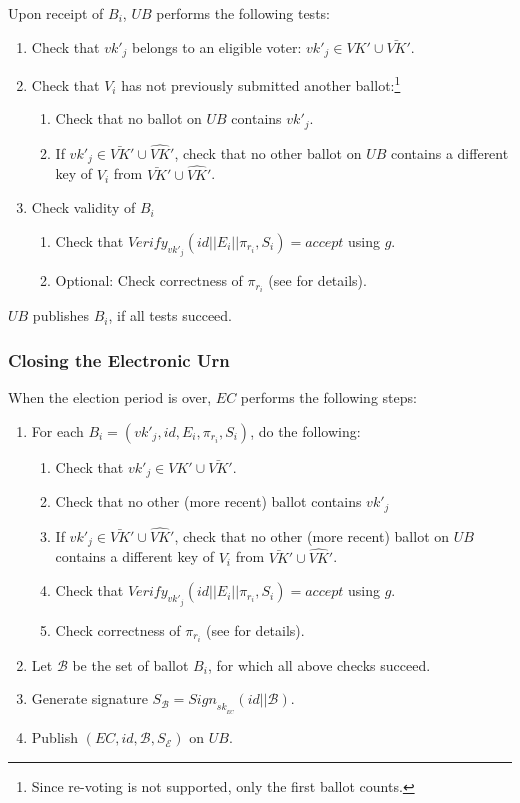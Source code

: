 \documentclass[bibtotoc,halfparskip,oneside]{scrreprt}
\newcommand{\eid}{\mathit{id}\xspace}
\newcommand{\sk}[1]{\mathit{sk}_{#1}\xspace}
\newcommand{\vkprime}[1]{\mathit{vk}'_{#1}\xspace}
\newcommand{\SK}[1]{\sk{_#1}\xspace}
\newcommand{\EC}{\ensuremath{\mathit{EC}}\xspace}
\newcommand{\UB}{\ensuremath{\mathit{UB}}\xspace}
\newcommand{\Voter}[1]{\ensuremath{\mathit{V}_{#1}}\xspace}
\begin{document}
Upon receipt of $B_i$, \UB performs the following tests:
\begin{enumerate}[resume]
	\item Check that $\vkprime{j}$ belongs to an eligible voter: $\vkprime{j}\in \mathit{VK}'\cup \bar{\mathit{VK}}'$.
	\item Check that $\Voter{i}$ has not previously submitted another ballot:\footnote{Since re-voting is not supported, only the first ballot counts.}
	\begin{enumerate}
		\item Check that no ballot on \UB contains $\vkprime{j}$.
		\item If $\vkprime{j}\in \bar{VK}'\cup\hat{VK}'$, check that no other ballot on \UB contains a different key of $\Voter{i}$ from $\bar{VK}'\cup\hat{VK}'$.
	\end{enumerate}
	\item Check validity of $B_i$
	\begin{enumerate}
		\item Check that $\mathit{Verify}_{\vkprime{j}}(\eid||E_i||\pi_{r_i},S_i)=\mathit{accept}$ using $\hat{g}$.
		\item Optional: Check correctness of $\pi_{r_i}$ (see  for details).
	\end{enumerate}
\end{enumerate}
\UB publishes $B_i$, if all tests succeed.

\subsubsection{Closing the Electronic Urn}

When the election period is over, \EC performs the following steps:
\begin{enumerate}
	\item For each $B_i=(\vkprime{j},\eid,E_i,\pi_{r_i},S_i)$, do the following:
	\begin{enumerate}
		\item Check that $\vkprime{j}\in \mathit{VK}'\cup \bar{\mathit{VK}}'$.
		\item Check that no other (more recent) ballot contains $\vkprime{j}$
		\item If $\vkprime{j}\in \bar{VK}'\cup\hat{VK}'$, check that no other (more recent) ballot on \UB contains a different key of $\Voter{i}$ from $\bar{VK}'\cup\hat{VK}'$.
		\item Check that $\mathit{Verify}_{\vkprime{j}}(\eid||E_i||\pi_{r_i},S_i)=\mathit{accept}$ using $\hat{g}$.
		\item Check correctness of $\pi_{r_i}$ (see  for details).
	\end{enumerate}
	\item Let $\mathcal{B}$ be the set of ballot $B_i$, for which all above checks succeed. 
	\item Generate signature $S_{\mathcal{B}}=\mathit{Sign}_{\SK{\EC}}(\eid||\mathcal{B})$.
	\item Publish $(\EC,\eid,\mathcal{B},S_{\mathcal{E}})$ on \UB.
\end{enumerate}
\end{document}
